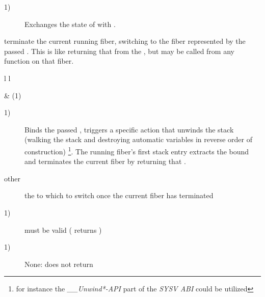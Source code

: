 \begin{description}
    \item[1)] Exchanges the state of  with .\\
\end{description}



terminate the current running fiber, switching to the fiber represented by
the passed \fiber. This is like returning that \fiber from the \entryfn, but may
be called from any function on that fiber.

\begin{tabular}{ l l }
    \midrule

     & (1)\\

    \midrule
\end{tabular}

\begin{description}
    \item[1)] Binds the passed \fiber, triggers a specific action that unwinds
              the stack (walking the stack and destroying automatic variables in
              reverse order of construction)
              \footnote{for instance the \emph{\_\_Unwind*-API} part of the
              \emph{SYSV ABI} could be utilized}.
              The running fiber's first stack entry extracts the bound \fiber
              and terminates the current fiber by returning that \fiber.
\end{description}

\begin{description}
    \item[other] the \fiber to which to switch once the current fiber has terminated
\end{description}

\begin{description}
    \item[1)]  must be valid ( returns )
\end{description}

\begin{description}
    \item[1)] None: \unwindfib does not return
\end{description}




